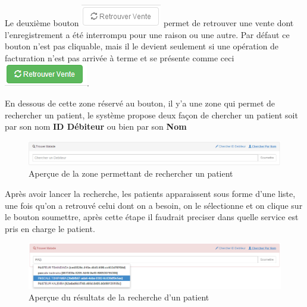 \documentclass[12pt,a4paper]{report}
\begin{document}
Le deuxième bouton \includegraphics[scale=0.7]{pic/RetrouverVente.png}  permet de retrouver une vente dont l'enregistrement a été interrompu pour une raison ou une autre. Par défaut ce bouton n'est pas cliquable, mais il le devient seulement si une opération de facturation n'est pas arrivée à terme et se présente comme ceci \includegraphics[scale=0.7]{pic/RetrouverVenteGreen.png}.

En dessous de cette zone réservé au bouton, il y'a une zone qui permet de rechercher un patient, le système propose deux façon de chercher un patient soit par son nom\textbf{ ID Débiteur} ou bien par son \textbf{Nom} 

\begin{figure}[h]
\begin{center}
\includegraphics[width=14cm]{pic/foundPatient.png}
\end{center}
\caption{Aperçue de la zone permettant de rechercher un patient}
\label{Aperçue de la zone permettant de rechercher un patient}
\end{figure}

Après avoir lancer la recherche, les patients apparaissent sous forme d'une liste, une fois qu'on a retrouvé celui dont on a besoin, on le sélectionne et on clique sur le bouton soumettre, après cette étape il faudrait preciser dans quelle service est pris en charge le patient.

\begin{figure}[h]
\begin{center}
\includegraphics[width=14cm]{pic/PatientTrouver.png}
\end{center}
\caption{Aperçue du résultats de la recherche d'un patient}
\label{Aperçue du résultats de la recherche d'un patient}
\end{figure}
\end{document}
